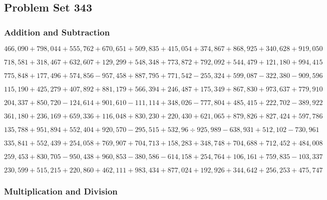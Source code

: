 \hypertarget{problem-set-343}{%
\subsection{Problem Set 343}\label{problem-set-343}}

\hypertarget{addition-and-subtraction}{%
\subsubsection{Addition and
Subtraction}\label{addition-and-subtraction}}

\(466,090+798,044+555,762+670,651+509,835+415,054+374,867+868,925+340,628+919,050\)

\(718,581+318,467+632,607+129,299+548,348+773,872+792,092+544,479+121,180+994,415\)

\(775,848+177,496+574,856-957,458+887,795+771,542-255,324+599,087-322,380-909,596\)

\(115,190+425,279+407,892+881,179+566,394+246,487+175,349+867,830+973,637+779,910\)

\(204,337+850,720-124,614+901,610-111,114+348,026-777,804+485,415+222,702-389,922\)

\(361,180+236,169+659,336+116,048+830,230+220,430+621,065+879,826+827,424+597,786\)

\(135,788+951,894+552,404+920,570-295,515+532,96÷925,989-638,931+512,102-730,961\)

\(335,841+552,439+254,058+769,907+704,713+158,283+348,748+704,688+712,452+484,008\)

\(259,453+830,705-950,438+960,853-380,586-614,158+254,764+106,161+759,835-103,337\)

\(230,599+515,215+220,860+462,111+983,434+877,024+192,926+344,642+256,253+475,747\)

\hypertarget{multiplication-and-division}{%
\subsubsection{Multiplication and
Division}\label{multiplication-and-division}}

